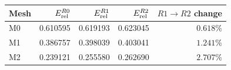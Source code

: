 \begin{tabular}{@{}lrrrr@{}}
\toprule
Mesh & $E_{\rm rel}^{R0}$ & $E_{\rm rel}^{R1}$ & $E_{\rm rel}^{R2}$ & $R1\to R2$ change\\
\midrule
M0 & 0.610595 & 0.619193 & 0.623045 & $0.618\%$\\
M1 & 0.386757 & 0.398039 & 0.403041 & $1.241\%$\\
M2 & 0.239121 & 0.255580 & 0.262690 & $2.707\%$\\
\bottomrule
\end{tabular}
